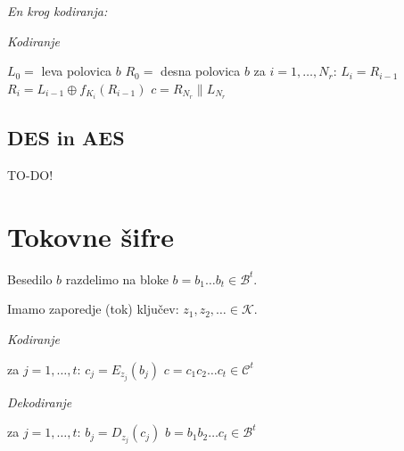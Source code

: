 \begin{multicols}{5}
\textit{En krog kodiranja:}
\begin{center}
\end{center}

\textit{Kodiranje}
\begin{koda}
$L_0 = $ leva polovica $b$
$R_0 = $ desna polovica $b$
za $i = 1, \dots, N_r$:
	$L_i = R_{i-1}$
	$R_i = L_{i-1} \oplus f_{K_i}(R_{i-1})$
$c = R_{N_r} \| L_{N_r}$
\end{koda}

\subsection*{DES in AES}
TO-DO!

\section*{Tokovne šifre}
Besedilo $b$ razdelimo na bloke $b = b_1 \dots b_t \in \mathcal{B}^t$.

Imamo zaporedje (tok) ključev: $z_1, z_2, \dots \in \mathcal{K}$.

\textit{Kodiranje}
\begin{koda}
za $j = 1, \dots, t$:
	$c_j = E_{z_j}(b_j)$
$c = c_1 c_2 \dots c_t \in \mathcal{C}^t$
\end{koda}

\textit{Dekodiranje}
\begin{koda}
za $j = 1, \dots, t$:
	$b_j = D_{z_j}(c_j)$
$b = b_1 b_2 \dots c_t \in \mathcal{B}^t$
\end{koda}


\end{multicols}
